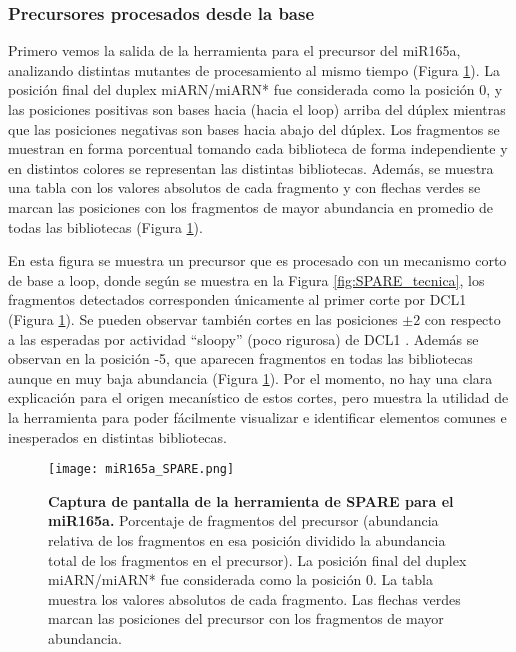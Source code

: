 \subsubsection{Precursores procesados desde la base}
Primero vemos la salida de la herramienta para el precursor del  miR165a, analizando distintas mutantes de procesamiento al mismo tiempo (Figura \ref{fig:miR165a_SPARE}).
La posición final del duplex miARN/miARN* fue considerada como la posición 0, y las posiciones positivas son bases hacia (hacia el loop) arriba del dúplex mientras que las posiciones negativas son bases hacia abajo del dúplex.
Los fragmentos se muestran en forma porcentual tomando cada biblioteca de forma independiente y en distintos colores se representan las distintas bibliotecas.
Además, se muestra una tabla con los valores absolutos de cada fragmento y con flechas verdes se marcan las posiciones con los fragmentos de mayor abundancia en promedio de todas las bibliotecas (Figura \ref{fig:miR165a_SPARE}).
 
En esta figura se muestra un precursor que es procesado con un mecanismo corto de base a loop, donde según se muestra en la Figura \ref{fig:SPARE_tecnica}, los fragmentos detectados corresponden únicamente al primer corte por DCL1 (Figura \ref{fig:miR165a_SPARE}).
Se pueden observar también cortes en las posiciones $\pm 2$ con respecto a las esperadas por actividad ``sloopy'' (poco rigurosa) de DCL1 \citep{pmid17989254}.
Además se observan en la posición -5, que aparecen fragmentos en todas las bibliotecas aunque en muy baja abundancia (Figura \ref{fig:miR165a_SPARE}).
Por el momento, no hay una clara explicación para el origen mecanístico de estos cortes, pero muestra la utilidad de la herramienta para poder fácilmente visualizar e identificar elementos comunes e inesperados en distintas bibliotecas.


\begin{landscape}
    \begin{figure}[htbp!] 
        \centering    
        \texttt{[image: miR165a\_SPARE.png]}
        \caption[Captura de pantalla de la herramienta de SPARE para el miR165a]{
        \textbf{Captura de pantalla de la herramienta de SPARE para el miR165a.}
        Porcentaje de fragmentos del precursor (abundancia relativa de los fragmentos en esa posición dividido la abundancia total de los fragmentos en el precursor).
        La posición final del duplex miARN/miARN* fue considerada como la posición 0.
        La tabla muestra los valores absolutos de cada fragmento.
        Las flechas verdes marcan las posiciones del precursor con los fragmentos de mayor abundancia. 
        }
         \label{fig:miR165a_SPARE}
    \end{figure}
\end{landscape}

